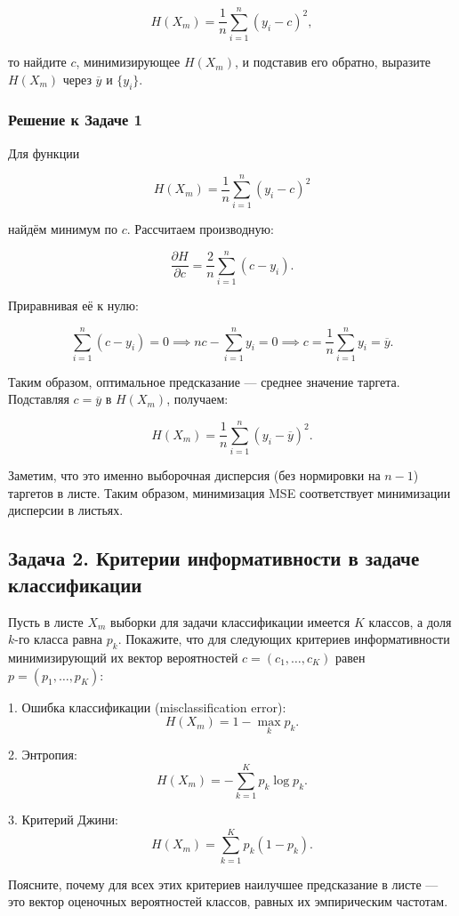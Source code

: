 \begin{itemize}
\[
H(X_m) = \frac{1}{n} \sum_{i=1}^n (y_i - c)^2,
\]

то найдите \(c\), минимизирующее \(H(X_m)\), и подставив его обратно, выразите \(H(X_m)\) через \(\overline{y}\) и \(\{y_i\}\).

\subsubsection*{Решение к Задаче 1}

Для функции

\[
H(X_m) = \frac{1}{n} \sum_{i=1}^n (y_i - c)^2
\]

найдём минимум по \(c\). Рассчитаем производную:

\[
\frac{\partial H}{\partial c} = \frac{2}{n} \sum_{i=1}^n (c - y_i).
\]

Приравнивая её к нулю:

\[
\sum_{i=1}^n (c - y_i) = 0 \implies nc - \sum_{i=1}^n y_i = 0 \implies c = \frac{1}{n}\sum_{i=1}^n y_i = \overline{y}.
\]

Таким образом, оптимальное предсказание — среднее значение таргета. Подставляя \(c = \overline{y}\) в \(H(X_m)\), получаем:

\[
H(X_m) = \frac{1}{n} \sum_{i=1}^n (y_i - \overline{y})^2.
\]

Заметим, что это именно выборочная дисперсия (без нормировки на \(n-1\)) таргетов в листе. Таким образом, минимизация MSE соответствует минимизации дисперсии в листьях.


\subsection*{Задача 2. Критерии информативности в задаче классификации}

Пусть в листе \(X_m\) выборки для задачи классификации имеется \(K\) классов, а доля \(k\)-го класса равна \(p_k\). Покажите, что для следующих критериев информативности минимизирующий их вектор вероятностей \(c = (c_1, \ldots, c_K)\) равен \(p = (p_1, \ldots, p_K)\):

1. Ошибка классификации (misclassification error): 
\[
H(X_m) = 1 - \max_k p_k.
\]

2. Энтропия:
\[
H(X_m) = -\sum_{k=1}^K p_k \log p_k.
\]

3. Критерий Джини:
\[
H(X_m) = \sum_{k=1}^K p_k(1 - p_k).
\]

Поясните, почему для всех этих критериев наилучшее предсказание в листе — это вектор оценочных вероятностей классов, равных их эмпирическим частотам.


\end{itemize}
